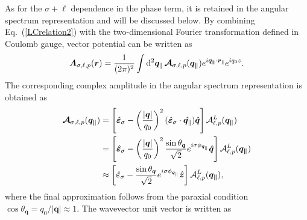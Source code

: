 %
%
%
%
As for the $\sigma+\ell$ dependence in the phase term, it is retained in the angular spectrum representation and will be discussed below. By combining Eq.~(\ref{LCrelation2}) with the two-dimensional Fourier transformation defined in Coulomb gauge, vector potential can be written as
\begin{equation}
\color{G}
\boldsymbol{A}_{\sigma, \ell, p}(\boldsymbol{r})
=
\frac{1}{(2\pi)^2}
\int {\rm d}^2 \boldsymbol{q}_\parallel
\,
\boldsymbol{\mathcal{A}}_{\sigma, \ell, p}(\boldsymbol{q_\parallel})
e^{i\boldsymbol{q_\parallel}\cdot \boldsymbol{r}_\parallel}
e^{iq_0 z}.
\label{planwaveinC}
\end{equation}
The corresponding complex amplitude in the angular spectrum representation is obtained as
\begin{align}
\color{G}
\boldsymbol{\mathcal{A}}_{\sigma, \ell, p}(\boldsymbol{q_\parallel})
&=
\left[
\hat{\boldsymbol{\varepsilon}}_\sigma
-
\left(
\frac{|\boldsymbol{q}|}{q_0}
\right)^2
(\hat{\boldsymbol{\varepsilon}}_\sigma\cdot\hat{\boldsymbol{q}_\parallel})
\hat{\boldsymbol{q}}
\right]
\mathcal{A}^L_{\ell, p}(\boldsymbol{q_\parallel}) \\
&=
\left[
\hat{\boldsymbol{\varepsilon}}_\sigma
-
\left(
\frac{|\boldsymbol{q}|}{q_0}
\right)^2
\frac{\sin\theta_{\boldsymbol{q}}}{\sqrt{2}}
e^{i\sigma\phi_{\boldsymbol{q}_\parallel}}
\hat{\boldsymbol{q}}
\right]
\mathcal{A}^L_{\ell, p}(\boldsymbol{q_\parallel}) \label{sigma_limit} \\
&\approx
\left[
\hat{\boldsymbol{\varepsilon}}_\sigma
-
\frac{\sin\theta_{\boldsymbol{q}}}{\sqrt{2}}
e^{i\sigma\phi_{\boldsymbol{q}_\parallel}}
\hat{\boldsymbol{z}}
\right]
\mathcal{A}^L_{\ell, p}(\boldsymbol{q_\parallel}),
\label{approx_to_1}
\end{align}
where the final approximation follows from the paraxial condition $\cos\theta_{\boldsymbol{q}} = q_0/|\boldsymbol{q}| \approx 1$. The wavevector unit vector is written as
